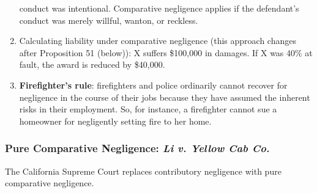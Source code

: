 \begin{enumerate}
    conduct was intentional. Comparative negligence applies if the defendant's 
    conduct was merely willful, wanton, or reckless.
    \item Calculating liability under comparative negligence (this approach 
    changes after Proposition 51 (below)): X suffers \$100,000 in damages. If X 
    was 40\% at fault, the award is reduced by \$40,000.
    \item \textbf{Firefighter's rule}: firefighters and police ordinarily 
    cannot recover for negligence in the course of their jobs because they 
    have assumed the inherent risks in their employment. So, for instance, a 
    firefighter cannot sue a homeowner for negligently setting fire to her 
    home.
\end{enumerate}

\subsubsection{Pure Comparative Negligence: \emph{Li v. Yellow Cab Co.}}

The California Supreme Court replaces contributory negligence with pure 
comparative negligence.

